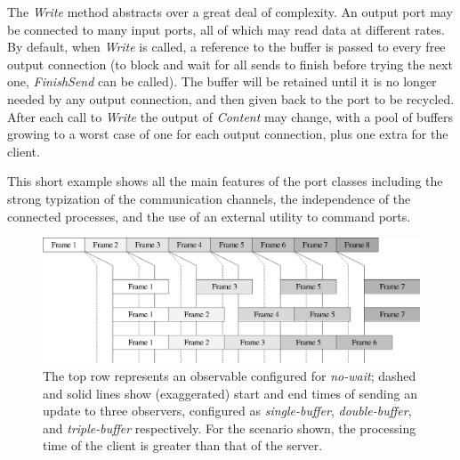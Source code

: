 The {\em Write} method abstracts over a great deal of complexity.
An output port may be connected to many input ports, all of which
may read data at different rates.  By default, when {\em Write}
is called, a reference to the buffer is passed to
every free output connection (to block and wait for all sends to finish before trying the next one, {\em FinishSend} can be called).  The buffer will be retained
until it is no longer needed by any output connection, and then
given back to the port to be recycled.  After each call to
{\em Write} the output of {\em Content} may change, with
a pool of buffers growing to a worst case of one for each
output connection, plus one extra for the client.

This short example shows all the main features of the port classes including the strong
typization of the communication channels, the independence of the connected processes, and
the use of an external utility to command ports.



\begin{figure}[t]
\includegraphics[width=\columnwidth]{fig-throughput-nowait}
\caption{
The top row represents an observable configured for \textit{no-wait};
dashed and solid lines show (exaggerated) start and end times of 
sending an update to three observers, configured as
 \textit{single-buffer},
 \textit{double-buffer},
and \textit{triple-buffer}
respectively.  For the scenario shown, the processing time of the
client is greater than that of the server.
}
\label{fig:throughput-nowait}
\end{figure}



